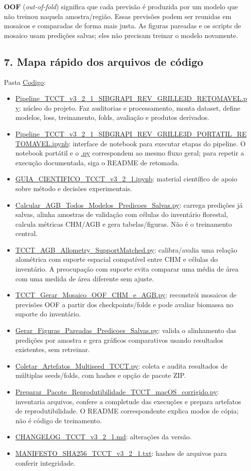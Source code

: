 \documentclass[11pt,a4paper]{article}
\begin{document}
\textbf{OOF} (\emph{out-of-fold}) significa que cada previsão é produzida por um modelo que não treinou naquela amostra/região. Essas previsões podem ser reunidas em mosaicos e comparadas de forma mais justa. As figuras pareadas e os scripts de mosaico usam predições salvas; eles não precisam treinar o modelo novamente.

\subsection{7. Mapa rápido dos arquivos de código}
Pasta \href{Codigo}{Codigo}:

\begin{itemize}
\item \url{Pipeline_TCCT_v3_2_1_SIBGRAPI_REV_GRILLE3D_RETOMAVEL.py}: núcleo do projeto. Faz auditorias e processamento, monta dataset, define modelos, loss, treinamento, folds, avaliação e produtos derivados.
\item \url{Pipeline_TCCT_v3_2_1_SIBGRAPI_REV_GRILLE3D_PORTATIL_RETOMAVEL.ipynb}: interface de notebook para executar etapas do pipeline. O notebook portátil e o \url{.py} correspondem ao mesmo fluxo geral; para repetir a execução documentada, siga o README de retomada.
\item \url{GUIA_CIENTIFICO_TCCT_v3_2_1.ipynb}: material científico de apoio sobre método e decisões experimentais.
\item \url{Calcular_AGB_Todos_Modelos_Predicoes_Salvas.py}: carrega predições já salvas, alinha amostras de validação com células do inventário florestal, calcula métricas CHM/AGB e gera tabelas/figuras. Não é o treinamento central.
\item \url{TCCT_AGB_Allometry_SupportMatched.py}: calibra/avalia uma relação alométrica com suporte espacial compatível entre CHM e células do inventário. A preocupação com suporte evita comparar uma média de área com uma medida de área diferente sem ajuste.
\item \url{TCCT_Gerar_Mosaico_OOF_CHM_e_AGB.py}: reconstrói mosaicos de previsões OOF a partir dos checkpoints/folds e pode avaliar biomassa no suporte do inventário.
\item \url{Gerar_Figuras_Pareadas_Predicoes_Salvas.py}: valida o alinhamento das predições por amostra e gera gráficos comparativos usando resultados existentes, sem retreinar.
\item \url{Coletar_Artefatos_Multiseed_TCCT.py}: coleta e audita resultados de múltiplas seeds/folds, com hashes e opção de pacote ZIP.
\item \url{Preparar_Pacote_Reprodutibilidade_TCCT_macOS_corrigido.py}: inventaria arquivos, confere a completude das execuções e prepara artefatos de reprodutibilidade. O README correspondente explica modos de cópia; não é código de treinamento.
\item \url{CHANGELOG_TCCT_v3_2_1.md}: alterações da versão.
\item \url{MANIFESTO_SHA256_TCCT_v3_2_1.txt}: hashes de arquivos para conferir integridade.
\end{itemize}
\end{document}
